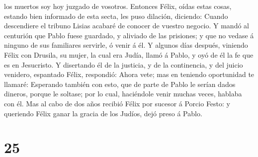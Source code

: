 los muertos soy hoy juzgado de vosotros.  Entonces Félix,
oídas estas cosas, estando bien informado de esta secta, les puso
dilación, diciendo: Cuando descendiere el tribuno Lisias acabaré de
conocer de vuestro negocio.  Y mandó al centurión que Pablo
fuese guardado, y aliviado de las prisiones; y que no vedase á ninguno
de sus familiares servirle, ó venir á él.  Y algunos días
después, viniendo Félix con Drusila, su mujer, la cual era Judía, llamó
á Pablo, y oyó de él la fe que es en Jesucristo.  Y
disertando él de la justicia, y de la continencia, y del juicio
venidero, espantado Félix, respondió: Ahora vete; mas en teniendo
oportunidad te llamaré:  Esperando también con esto, que de
parte de Pablo le serían dados dineros, porque le soltase; por lo cual,
haciéndole venir muchas veces, hablaba con él.  Mas al cabo
de dos años recibió Félix por sucesor á Porcio Festo: y queriendo Félix
ganar la gracia de los Judíos, dejó preso á Pablo.

\hypertarget{section-24}{%
\section{25}\label{section-24}}

